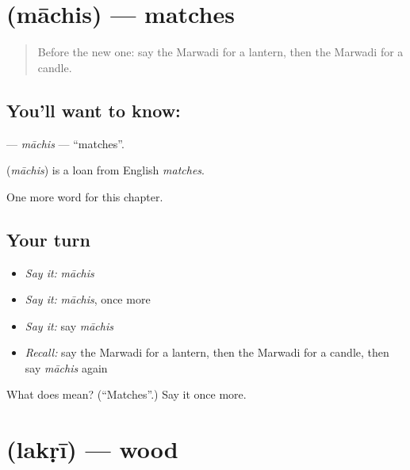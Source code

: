 \section[\texorpdfstring{\mw{माचिस} (māchis)}{माचिस (māchis)}]{ (māchis) — matches}

\label{lesson:MW-C125-machis}



\begin{quote}
Before the new one: say the Marwadi for a lantern, then the Marwadi for a candle.
\end{quote}

\subsection*{You'll want to know: }
\textbf{} — \emph{māchis} — \textquotedblleft{}matches\textquotedblright{}.

\begin{cousinweb}
\textbf{} (\emph{māchis}) is a loan from English \emph{matches}.
\end{cousinweb}

\begin{grammarlens}[title={What you've built}]
One more word for this chapter.
\end{grammarlens}

\subsection*{Your turn}
\begin{itemize}
\raggedright
  \item \emph{Say it:} \emph{māchis}
  \item \emph{Say it:} \emph{māchis}, once more
  \item \emph{Say it:} say \emph{māchis}
  \item \emph{Recall:} say the Marwadi for a lantern, then the Marwadi for a candle, then say \emph{māchis} again
\end{itemize}

\begin{tcolorbox}[breakable,colback=teal!4,colframe=teal!35!black,title={Before you move on}]
What does  mean? (\textquotedblleft{}Matches\textquotedblright{}.) Say it once more.
\end{tcolorbox}
\section[\texorpdfstring{\mw{लकड़ी} (lakṛī)}{लकड़ी (lakṛī)}]{ (lakṛī) — wood}

